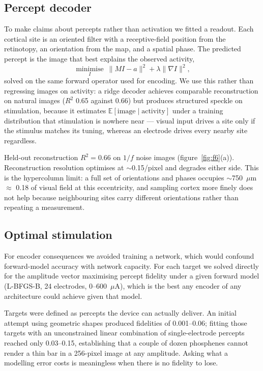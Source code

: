 \documentclass[10pt,twocolumn]{article}
\newcommand{\um}{\ensuremath{\mu\text{m}}}
\newcommand{\uA}{\ensuremath{\mu\text{A}}}
\begin{document}
\subsection{Percept decoder}

To make claims about percepts rather than activation we fitted a readout.
Each cortical site is an oriented filter with a receptive-field position
from the retinotopy, an orientation from the map, and a spatial phase. The
predicted percept is the image that best explains the observed activity,
\begin{equation}
  \operatorname*{minimise}_{I}\ \lVert MI - a\rVert^2 + \lambda\lVert\nabla I\rVert^2,
\end{equation}
solved on the same forward operator used for encoding. We use this rather
than regressing images on activity: a ridge decoder achieves comparable
reconstruction on natural images ($R^2$ 0.65 against 0.66) but produces
structured speckle on stimulation, because it estimates
$\mathbb{E}[\text{image}\mid\text{activity}]$ under a training distribution
that stimulation is nowhere near --- visual input drives a site only if the
stimulus matches its tuning, whereas an electrode drives every nearby site
regardless.

Held-out reconstruction $R^2 = 0.66$ on $1/f$ noise images
(figure~\ref{fig:f6}(a)). Reconstruction resolution optimises at
$\sim$0.15\textdegree/pixel and degrades either side. This is the
hypercolumn limit: a full set of orientations and phases occupies
$\sim$750~\um{} $\approx$ 0.18\textdegree{} of visual field at this
eccentricity, and sampling cortex more finely does not help because
neighbouring sites carry different orientations rather than repeating a
measurement.

\subsection{Optimal stimulation}

For encoder consequences we avoided training a network, which would
confound forward-model accuracy with network capacity. For each target we
solved directly for the amplitude vector maximising percept fidelity under a
given forward model (L-BFGS-B, 24 electrodes, 0--600~\uA), which is the best
any encoder of any architecture could achieve given that model.

Targets were defined as percepts the device can actually deliver. An
initial attempt using geometric shapes produced fidelities of 0.001--0.06;
fitting those targets with an unconstrained linear combination of
single-electrode percepts reached only 0.03--0.15, establishing that a
couple of dozen phosphenes cannot render a thin bar in a 256-pixel image at
any amplitude. Asking what a modelling error costs is meaningless when there
is no fidelity to lose.
\end{document}

